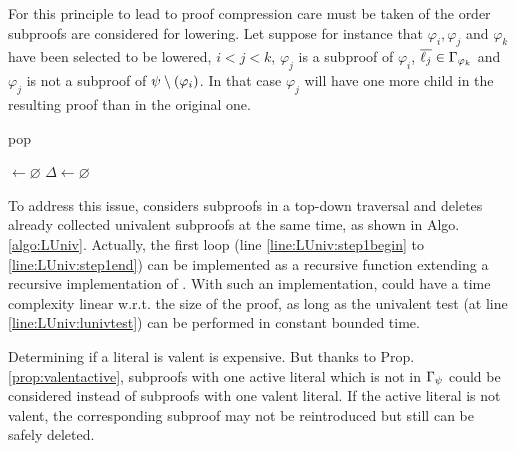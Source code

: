 \documentclass{llncs}
\begin{document}
For this principle to lead to proof compression care must be taken of the order subproofs are
considered for lowering. Let suppose for instance that $\varphi_i, \varphi_j$ and $\varphi_k$ have
been selected to be lowered, $i < j < k$, $\varphi_j$ is a subproof of $\varphi_i$, $\overline{\ell_j}
\in \Gamma_{\varphi_k}$ and $\varphi_j$ is not a subproof of $\psi \setminus (\varphi_i)$. In that
case $\varphi_j$ will have one more child in the resulting proof than in the original one.

\begin{algorithm}[bt]
  \BlankLine

   {pop}

  \Univ $\leftarrow \varnothing$ \;
  $\Delta \leftarrow \varnothing$ \;
  \BlankLine

  \BlankLine


  \caption{\LowerUnivalents}
  \label{algo:LUniv}
\end{algorithm}

To address this issue, {\LowerUnivalents} considers subproofs in a top-down traversal and deletes
already collected univalent subproofs at the same time, as shown in Algo. \ref{algo:LUniv}.
Actually, the first loop (line \ref{line:LUniv:step1begin} to \ref{line:LUniv:step1end}) can be
implemented as a recursive function extending a recursive implementation of . With
such an implementation, {\LowerUnivalents} could have a time complexity linear w.r.t. the size of
the proof, as long as the univalent test (at line \ref{line:LUniv:lunivtest}) can be performed in
constant bounded time.

Determining if a literal is valent is expensive. But thanks to Prop. \ref{prop:valentactive},
subproofs with one active literal which is not in $\Gamma_{\psi}$ could be considered instead
of subproofs with one valent literal.  If the active literal is not valent, the corresponding
subproof may not be reintroduced but still can be safely deleted.
\end{document}
